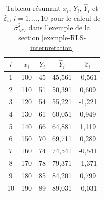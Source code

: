 \begin{table}[h!]
\caption{Tableau résumant $x_i$, $Y_i$, $\hat Y_i$ et $\hat\varepsilon_i$, $i=1,\dots,10$ pour le calcul de $\hat\sigma^2_{MV}$ dans l'exemple de la section \ref{exemple-RLS-interpretation}}
\label{tab:cal_sigma2_exp}
\begin{center}
\begin{tabular}{c|cccc}
\centering
$i$ & $x_i$& $Y_i$ & $\hat Y_i$ & $\hat\varepsilon_i$ \\ \hline
1 & 100 & 45 & 45,561 &  -0,561 \\
2 & 110  & 51  & 50,391 & 0,609 \\
3 &  120 & 54  & 55,221 & -1,221 \\
4 & 130  & 61 & 60,051 & 0,949\\
5 & 140 & 66  & 64,881  &  1,119 \\
6 & 150  & 70 & 69,711  & 0,289\\
7 &160  & 74 & 74,541 & -0,541\\
8 & 170  & 78 & 79,371 & -1,371\\
9 & 180 & 85 & 84,201 & 0,799\\
10 & 190  & 89 & 89,031 & -0,031
\end{tabular}
\end{center}
\end{table}

